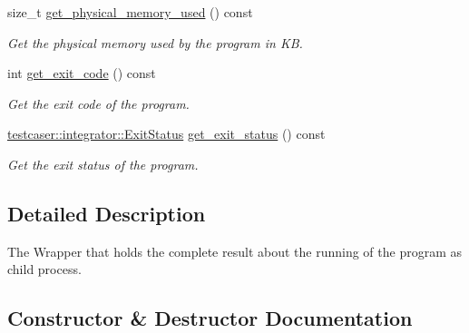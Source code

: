 \begin{DoxyCompactItemize}
size\+\_\+t \hyperlink{classtestcaser_1_1integrator_1_1Result_a7512baef0e0dc77c8543972917852dfa}{get\+\_\+physical\+\_\+memory\+\_\+used} () const
\begin{DoxyCompactList}\small\item\em Get the physical memory used by the program in KB. \end{DoxyCompactList}\item 
int \hyperlink{classtestcaser_1_1integrator_1_1Result_a0795d3307ac8c3186288020bc75b3767}{get\+\_\+exit\+\_\+code} () const
\begin{DoxyCompactList}\small\item\em Get the exit code of the program. \end{DoxyCompactList}\item 
\hyperlink{namespacetestcaser_1_1integrator_a68fcfdfd3f063954e9fd1a94f4b4f755}{testcaser\+::integrator\+::\+Exit\+Status} \hyperlink{classtestcaser_1_1integrator_1_1Result_aadd7237340243c5506d1fbf23f30e9d5}{get\+\_\+exit\+\_\+status} () const
\begin{DoxyCompactList}\small\item\em Get the exit status of the program. \end{DoxyCompactList}\end{DoxyCompactItemize}


\subsection{Detailed Description}
The Wrapper that holds the complete result about the running of the program as child process. 

\subsection{Constructor \& Destructor Documentation}
\mbox{\label{classtestcaser_1_1integrator_1_1Result_a74713e8425d62a6ea2e349b8255e3a95}} 
